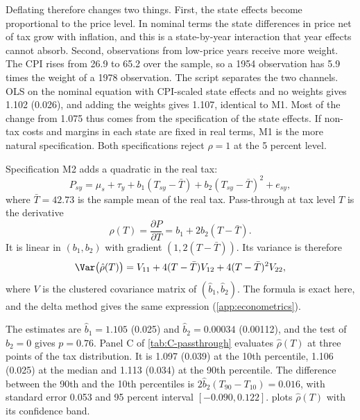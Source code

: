Deflating therefore changes two things. First, the state effects become proportional to the price level. In nominal
terms the state differences in price net of tax grow with inflation, and this is a state-by-year interaction that
year effects cannot absorb. Second, observations from low-price years receive more weight. The CPI rises from 26.9 to
65.2 over the sample, so a 1954 observation has 5.9 times the weight of a 1978 observation. The script separates the
two channels. OLS on the nominal equation with CPI-scaled state effects and no weights gives 1.102 (0.026), and adding
the weights gives 1.107, identical to M1. Most of the change from 1.075 thus comes from the specification of the state
effects. If non-tax costs and margins in each state are fixed in real terms, M1 is the more natural specification.
Both specifications reject $\rho = 1$ at the 5 percent level.

Specification M2 adds a quadratic in the real tax:
\begin{equation}\label{eq:C-M2}
P_{sy} = \mu_s + \tau_y + b_1(T_{sy} - \bar T) + b_2(T_{sy} - \bar T)^2 + e_{sy} ,
\end{equation}
where $\bar T = 42.73$ is the sample mean of the real tax. Pass-through at tax level $T$ is the derivative
\begin{equation*}
\rho(T) = \frac{\partial P}{\partial T} = b_1 + 2b_2(T - \bar T) .
\end{equation*}
It is linear in $(b_1, b_2)$ with gradient $(1, 2(T - \bar T))$. Its variance is therefore
\begin{equation*}
\Var\big(\hat\rho(T)\big) = V_{11} + 4(T - \bar T)V_{12} + 4(T - \bar T)^2V_{22} ,
\end{equation*}
where $V$ is the clustered covariance matrix of $(\hat b_1, \hat b_2)$. The formula is exact here, and the delta
method gives the same expression (\cref{app:econometrics}).

The estimates are $\hat b_1 = 1.105$ (0.025) and $\hat b_2 = 0.00034$ (0.00112), and the test of $b_2 = 0$ gives
$p = 0.76$. Panel C of \cref{tab:C-passthrough} evaluates $\hat\rho(T)$ at three points of the tax distribution. It
is 1.097 (0.039) at the 10th percentile, 1.106 (0.025) at the median and 1.113 (0.034) at the 90th percentile. The
difference between the 90th and the 10th percentiles is $2\hat b_2(T_{90} - T_{10}) = 0.016$, with standard error
0.053 and 95 percent interval $[-0.090, 0.122]$.  plots $\hat\rho(T)$ with its confidence band.

